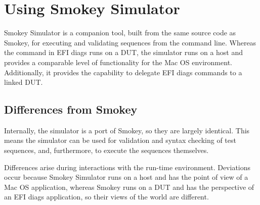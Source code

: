 
\section{Using Smokey Simulator}

Smokey Simulator is a companion tool, built from the same source code as
Smokey, for executing and validating sequences from the command line.  Whereas
the  command in EFI diags runs on a DUT, the simulator runs on
a host and provides a comparable level of functionality for the Mac OS
environment.  Additionally, it provides the capability to delegate EFI diags
commands to a linked DUT.

\subsection{Differences from Smokey}

Internally, the simulator is a port of Smokey, so they are largely identical.
This means the simulator can be used for validation and syntax checking of test
sequences, and, furthermore, to execute the sequences themselves.

Differences arise during interactions with the run-time environment.
Deviations occur because Smokey Simulator runs on a host and has the point of
view of a Mac OS application, whereas Smokey runs on a DUT and has the
perspective of an EFI diags application, so their views of the world are
different.


